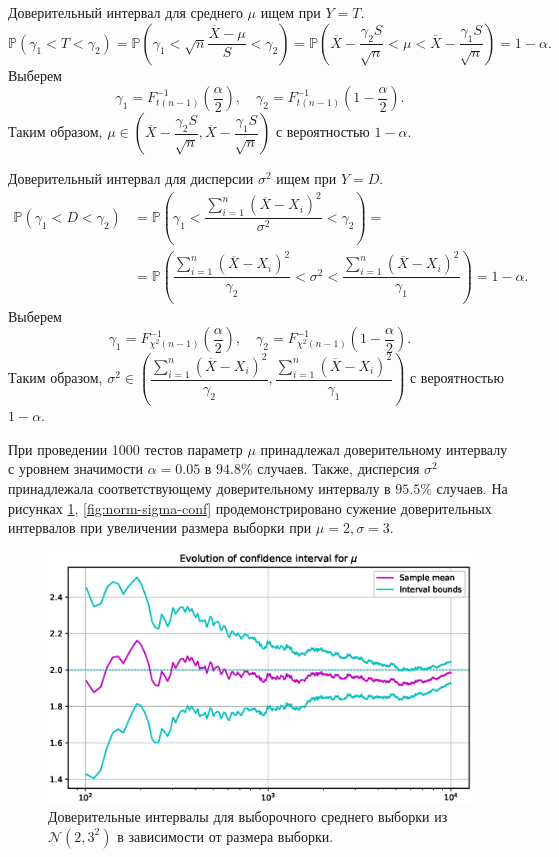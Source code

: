 \documentclass[11pt]{report}
\begin{document}
Доверительный интервал для среднего $\mu$ ищем при $Y=T$.
$$
\mathbb{P}(\gamma_1 < T < \gamma_2) = \mathbb{P}\left(\gamma_1 < \sqrt{n}\dfrac{\overline{X} - \mu}{S} < \gamma_2\right) =
\mathbb{P}\left( \overline{X}-\dfrac{\gamma_2S}{\sqrt{n}} < \mu < \overline{X}-\dfrac{\gamma_1S}{\sqrt{n}} \right) = 1-\alpha.
$$
Выберем
$$
\gamma_1 = F^{-1}_{t(n-1)}\left(\frac{\alpha}{2} \right),\quad \gamma_2 = F^{-1}_{t(n-1)}\left(1-\dfrac{\alpha}{2}\right).
$$
Таким образом, $\mu\in\left(\overline{X}-\dfrac{\gamma_2S}{\sqrt{n}},\overline{X}-\dfrac{\gamma_1S}{\sqrt{n}}\right)$ с вероятностью $1-\alpha$.

Доверительный интервал для дисперсии $\sigma^2$ ищем при $Y=D$.
$$
\begin{aligned}
\mathbb{P}(\gamma_1 < D < \gamma_2) &= \mathbb{P}\left(\gamma_1 < \dfrac{\sum_{i=1}^n(\overline{X} - X_i)^2}{\sigma^2} < \gamma_2\right) = \\
&=\mathbb{P}\left( \dfrac{\sum_{i=1}^n(\overline{X} - X_i)^2}{\gamma_2} < \sigma^2 < \dfrac{\sum_{i=1}^n(\overline{X} - X_i)^2}{\gamma_1} \right) = 1-\alpha.
\end{aligned}
$$
Выберем
$$
\gamma_1 = F^{-1}_{\chi^2(n-1)}\left(\frac{\alpha}{2} \right),\quad \gamma_2 = F^{-1}_{\chi^2(n-1)}\left(1-\dfrac{\alpha}{2}\right).
$$
Таким образом, $\sigma^2\in\left(\dfrac{\sum_{i=1}^n(\overline{X} - X_i)^2}{\gamma_2}, \dfrac{\sum_{i=1}^n(\overline{X} - X_i)^2}{\gamma_1}\right)$ с вероятностью $1-\alpha$.

При проведении 1000 тестов параметр $\mu$ принадлежал доверительному интервалу с уровнем значимости $\alpha=0.05$ в $94.8\%$ случаев. Также, дисперсия $\sigma^2$ принадлежала соответствующему доверительному интервалу в $95.5\%$ случаев. На рисунках \ref{fig:norm-mu-conf}, \ref{fig:norm-sigma-conf} продемонстрировано сужение доверительных интервалов при увеличении размера выборки при $\mu=2,\sigma=3$.

\begin{figure}[H]
    \centering
    \includegraphics[width=0.9\linewidth]{images/norm-mu-conf.eps}
    \caption{Доверительные интервалы для выборочного среднего выборки из $\mathcal{N}(2,3^2)$ в зависимости от размера выборки.}
    \label{fig:norm-mu-conf}
\end{figure}
\end{document}
